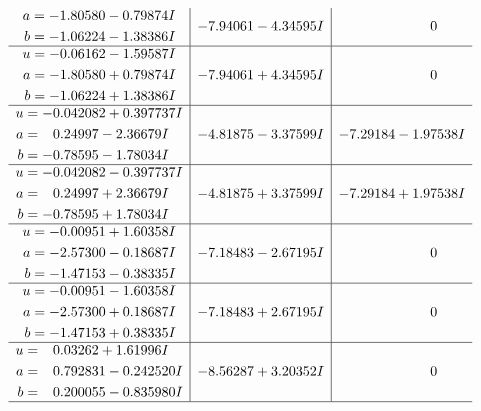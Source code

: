 \documentclass[1p]{elsarticle_modified}
\theoremstyle{definition}
\begin{document}
$$\begin{array}{c|c|c}
\begin{aligned}
a &= -1.80580 - 0.79874 I \\
b &= -1.06224 - 1.38386 I\end{aligned}
 & -7.94061 - 4.34595 I & \phantom{-0.000000 } 0 \\ \hline\begin{aligned}
u &= -0.06162 - 1.59587 I \\
a &= -1.80580 + 0.79874 I \\
b &= -1.06224 + 1.38386 I\end{aligned}
 & -7.94061 + 4.34595 I & \phantom{-0.000000 } 0 \\ \hline\begin{aligned}
u &= -0.042082 + 0.397737 I \\
a &= \phantom{-}0.24997 - 2.36679 I \\
b &= -0.78595 - 1.78034 I\end{aligned}
 & -4.81875 - 3.37599 I & -7.29184 - 1.97538 I \\ \hline\begin{aligned}
u &= -0.042082 - 0.397737 I \\
a &= \phantom{-}0.24997 + 2.36679 I \\
b &= -0.78595 + 1.78034 I\end{aligned}
 & -4.81875 + 3.37599 I & -7.29184 + 1.97538 I \\ \hline\begin{aligned}
u &= -0.00951 + 1.60358 I \\
a &= -2.57300 - 0.18687 I \\
b &= -1.47153 - 0.38335 I\end{aligned}
 & -7.18483 - 2.67195 I & \phantom{-0.000000 } 0 \\ \hline\begin{aligned}
u &= -0.00951 - 1.60358 I \\
a &= -2.57300 + 0.18687 I \\
b &= -1.47153 + 0.38335 I\end{aligned}
 & -7.18483 + 2.67195 I & \phantom{-0.000000 } 0 \\ \hline\begin{aligned}
u &= \phantom{-}0.03262 + 1.61996 I \\
a &= \phantom{-}0.792831 - 0.242520 I \\
b &= \phantom{-}0.200055 - 0.835980 I\end{aligned}
 & -8.56287 + 3.20352 I & \phantom{-0.000000 } 0\\
 \hline 
 \end{array}$$\newpage$$\begin{array}{c|c|c}  

\end{array}$$
\end{document}
